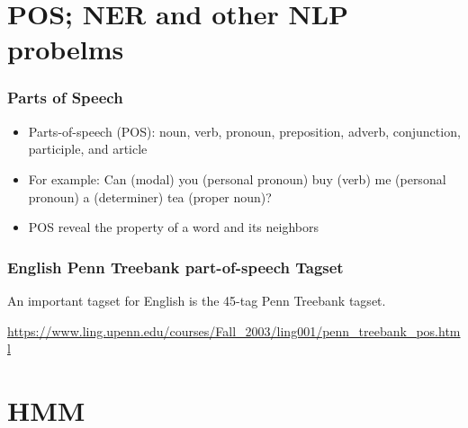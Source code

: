 \documentclass[notheorems, aspectratio=54]{beamer}
\begin{document}
\section{POS; NER and other NLP probelms}
\begin{frame}
\frametitle{Parts of Speech}
\begin{itemize}
\item Parts-of-speech (POS): noun, verb, pronoun, preposition, adverb, conjunction, participle, and article
\item For example: Can (modal) you (personal pronoun) buy (verb) me (personal pronoun) a (determiner) tea (proper noun)?
\item POS reveal the property of a word and its neighbors

\end{itemize}
\end{frame}

\begin{frame}

\frametitle{English Penn Treebank part-of-speech Tagset}

An important tagset for English is the 45-tag Penn Treebank tagset. 

\vspace{1cm}

\url{https://www.ling.upenn.edu/courses/Fall_2003/ling001/penn_treebank_pos.html}

\end{frame}

\section{HMM}
\subsection{}
\end{document}

